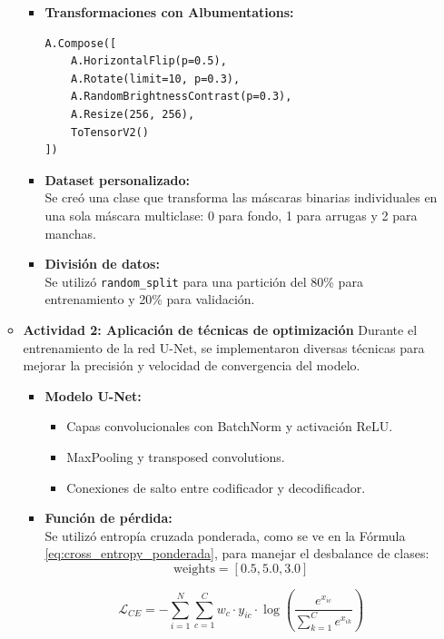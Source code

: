 \begin{enumerate}
\begin{itemize}
\begin{itemize}
  \item \textbf{Transformaciones con Albumentations:}
\begin{verbatim}
A.Compose([
    A.HorizontalFlip(p=0.5),
    A.Rotate(limit=10, p=0.3),
    A.RandomBrightnessContrast(p=0.3),
    A.Resize(256, 256),
    ToTensorV2()
])
\end{verbatim}

  \item \textbf{Dataset personalizado:} \\
  Se creó una clase que transforma las máscaras binarias individuales en una sola máscara multiclase: 0 para fondo, 1 para arrugas y 2 para manchas.

  \item \textbf{División de datos:} \\
  Se utilizó \texttt{random\_split} para una partición del 80\% para entrenamiento y 20\% para validación.
\end{itemize}

\vspace{0.5cm}

  \item\textbf{Actividad 2: Aplicación de técnicas de optimización}
  Durante el entrenamiento de la red U-Net, se implementaron diversas técnicas para mejorar la precisión y velocidad de convergencia del modelo.

\begin{itemize}
  \item \textbf{Modelo U-Net:}
  \begin{itemize}
    \item Capas convolucionales con BatchNorm y activación ReLU.
    \item MaxPooling y transposed convolutions.
    \item Conexiones de salto entre codificador y decodificador.
  \end{itemize}
  
  \item \textbf{Función de pérdida:} \\
  Se utilizó entropía cruzada ponderada, como se ve en la Fórmula \ref{eq:cross_entropy_ponderada}, para manejar el desbalance de clases:
  \[
    \text{weights} = [0.5, 5.0, 3.0]
\]

\begin{equation}\label{eq:cross_entropy_ponderada}
  \mathcal{L}_{CE} = - \sum_{i=1}^{N} \sum_{c=1}^{C} w_c \cdot y_{ic} \cdot \log \left( \frac{e^{x_{ic}}}{\sum_{k=1}^{C} e^{x_{ik}}} \right)
\end{equation}


\end{itemize}
\end{itemize}
\end{enumerate}
